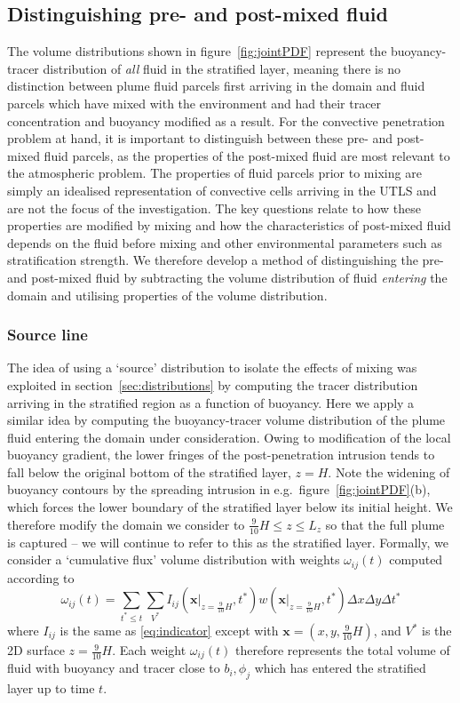 \documentclass[a4paper]{article}
\begin{document}
\subsection{Distinguishing pre- and post-mixed fluid}
\label{sec:jointPDF}

The volume distributions shown in figure~\ref{fig:jointPDF} represent the buoyancy-tracer distribution of
\emph{all} fluid in the stratified layer, meaning there is no distinction between plume fluid parcels first
arriving in the domain and fluid parcels which have mixed with the environment and had their tracer
concentration and buoyancy modified as a result. For the convective penetration problem at hand, it is
important to distinguish between these pre- and post-mixed fluid parcels, as the properties of the post-mixed
fluid are most relevant to the atmospheric problem. The properties of fluid parcels prior to mixing are simply
an idealised representation of convective cells arriving in the UTLS and are not the focus of the
investigation. The key questions relate to how these properties are modified by mixing and how the
characteristics of post-mixed fluid depends on the fluid before mixing and other environmental parameters such
as stratification strength. We therefore develop a method of distinguishing the pre- and post-mixed fluid by
subtracting the volume distribution of fluid \emph{entering} the domain and utilising properties of
the volume distribution.

\subsubsection{Source line}
The idea of using a `source' distribution to isolate the effects of mixing was exploited in
section~\ref{sec:distributions} by computing the tracer distribution arriving in the stratified region as a
function of buoyancy. Here we apply a similar idea by computing the buoyancy-tracer volume distribution of the
plume fluid entering the domain under consideration. Owing to modification of the local buoyancy gradient,
the lower fringes of the post-penetration intrusion tends to fall below the original bottom of the stratified
layer, $z=H$. Note the widening of buoyancy contours by the spreading intrusion in e.g.\
figure~\ref{fig:jointPDF}(b), which forces the lower boundary of the stratified layer below its initial
height. We therefore modify the domain we consider to $\frac{9}{10}H \le z \le L_z$ so that the full plume is
captured -- we will continue to refer to this as the stratified layer. Formally, we consider a `cumulative
flux' volume distribution with weights $\omega_{ij}(t)$ computed according to
\begin{equation}
	\omega_{ij}(t) = \sum_{t^* \le t} \sum_{V^*} I_{ij}(\left.\bm{x}\right|_{z=\frac{9}{10}H}, t^*)
		w(\left.\bm{x}\right|_{z=\frac{9}{10}H}, t^*) \Delta x \Delta y \Delta t^*
\end{equation}
where $I_{ij}$ is the same as \eqref{eq:indicator} except with $\bm{x} = (x, y, \frac{9}{10}H)$, and $V^*$ is
the 2D surface $z=\frac{9}{10}H$. Each weight $\omega_{ij}(t)$ therefore represents the total volume of fluid
with buoyancy and tracer close to $b_i, \phi_j$ which has entered the stratified layer up to time $t$.
\end{document}
